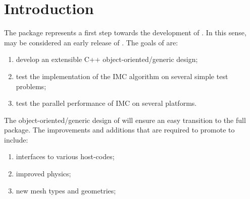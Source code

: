 
\section{Introduction}

The \imctest package represents a first step towards the development
of \milagro.  In this sense, \imctest may be considered an early
release of \milagro.  The goals of \imctest are:
\begin{enumerate}
\item develop an extensible C++ object-oriented/generic design;
\item test the implementation of the IMC algorithm on several simple
  test problems;
\item test the parallel performance of IMC on several platforms.
\end{enumerate}
The object-oriented/generic design of \imctest will ensure an easy
transition to the full \milagro package.  The improvements and
additions that are required to promote \imctest to \milagro include:
\begin{enumerate}
\item interfaces to various host-codes;
\item improved physics;
\item new mesh types and geometries;
\end{enumerate}